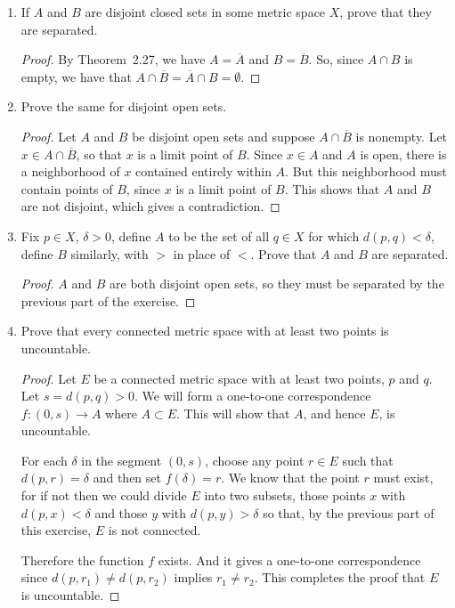 
\begin{enumerate}
\item If $A$ and $B$ are disjoint closed sets in some metric space
  $X$, prove that they are separated.
  \begin{proof}
    By Theorem~2.27, we have $A = \overline{A}$ and
    $B = \overline{B}$. So, since $A\cap B$ is empty, we have that
    $A\cap\overline{B} = \overline{A}\cap B = \emptyset$.
  \end{proof}
\item Prove the same for disjoint open sets.
  \begin{proof}
    Let $A$ and $B$ be disjoint open sets and suppose
    $A\cap\overline{B}$ is nonempty. Let $x\in A\cap\overline{B}$, so
    that $x$ is a limit point of $B$. Since $x\in A$ and $A$ is open,
    there is a neighborhood of $x$ contained entirely within $A$. But
    this neighborhood must contain points of $B$, since $x$ is a limit
    point of $B$. This shows that $A$ and $B$ are not disjoint, which
    gives a contradiction.
  \end{proof}
\item Fix $p\in X$, $\delta > 0$, define $A$ to be the set of all
  $q\in X$ for which $d(p,q) < \delta$, define $B$ similarly, with $>$
  in place of $<$. Prove that $A$ and $B$ are separated.
  \begin{proof}
    $A$ and $B$ are both disjoint open sets, so they must be separated
    by the previous part of the exercise.
  \end{proof}
\item Prove that every connected metric space with at least two points
  is uncountable.
  \begin{proof}
    Let $E$ be a connected metric space with at least two points, $p$
    and $q$. Let $s = d(p,q) > 0$. We will form a one-to-one
    correspondence $f\colon(0,s)\to A$ where $A\subset E$. This will
    show that $A$, and hence $E$, is uncountable.

    For each $\delta$ in the segment $(0,s)$, choose any point
    $r\in E$ such that $d(p,r) = \delta$ and then set $f(\delta) =
    r$. We know that the point $r$ must exist, for if not then we
    could divide $E$ into two subsets, those points $x$ with
    $d(p,x) < \delta$ and those $y$ with $d(p,y) > \delta$ so that, by
    the previous part of this exercise, $E$ is not connected.

    Therefore the function $f$ exists. And it gives a one-to-one
    correspondence since $d(p,r_1)\neq d(p,r_2)$ implies
    $r_1\neq r_2$. This completes the proof that $E$ is uncountable.
  \end{proof}
\end{enumerate}
